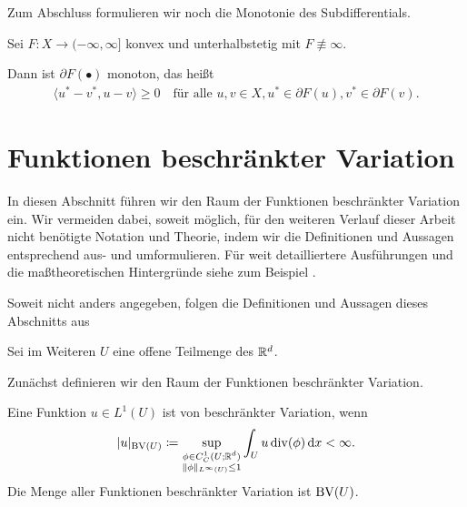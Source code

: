 Zum Abschluss formulieren wir noch die Monotonie des Subdifferentials.

\begin{theorem}
  \label{thm:subdifferentialMonotonicity}
  Sei $F:X\to (-\infty,\infty]$ konvex und unterhalbstetig mit $F\nequiv\infty$.

  Dann ist $\partial F(\bullet)$ monoton, das heißt 
  \begin{align*}
    \langle u^\ast-v^\ast,u-v\rangle\geq 0\quad \text{für alle } u,v\in X, 
    u^\ast \in \partial F(u), v^\ast \in \partial F(v).
  \end{align*}
\end{theorem}


\section{Funktionen beschränkter Variation}
\label{sec:bvFunctions}

In diesen Abschnitt führen wir den Raum der Funktionen beschränkter Variation
ein.
Wir vermeiden dabei, soweit möglich, für den weiteren Verlauf dieser Arbeit
nicht benötigte Notation und Theorie, indem wir die Definitionen und Aussagen 
entsprechend aus- und umformulieren.
Für weit detailliertere Ausführungen und die
maßtheoretischen Hintergründe siehe zum Beispiel \cite{ABM14, EG92, Bra98}. 

Soweit nicht anders angegeben, folgen die Definitionen und Aussagen
dieses Abschnitts aus \cite[S. 393-395]{ABM14}

Sei im Weiteren $U$ eine offene Teilmenge des $\mathbb{R}^d$.

Zunächst definieren wir den Raum der Funktionen beschränkter Variation.

\begin{definition}
  Eine Funktion $u\in L^1(U)$ ist von beschränkter Variation, wenn   
  \begin{align}
    \label{eq:boundedVariation}
    |u|_{\textup{BV}(U)}
    \coloneqq
    \sup_{\substack{\phi\in C^1_C(U;\mathbb{R}^d)\\
    \Vert\phi\Vert_{L^\infty(U)}\leq 1}}\int_U u\operatorname{div} (\phi)\,\mathrm{d}x
    <
    \infty.
  \end{align}
  Die Menge aller Funktionen beschränkter Variation ist $\textup{BV}(U)$.
\end{definition}

